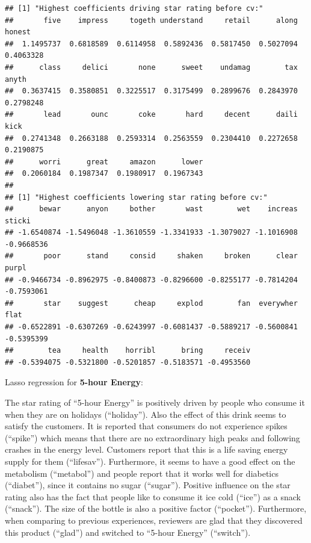 \documentclass[
]{article}
\begin{document}
\begin{verbatim}
## [1] "Highest coefficients driving star rating before cv:"
##       five    impress     togeth understand     retail      along     honest 
##  1.1495737  0.6818589  0.6114958  0.5892436  0.5817450  0.5027094  0.4063328 
##      class     delici       none      sweet    undamag        tax      anyth 
##  0.3637415  0.3580851  0.3225517  0.3175499  0.2899676  0.2843970  0.2798248 
##       lead       ounc       coke       hard     decent      daili       kick 
##  0.2741348  0.2663188  0.2593314  0.2563559  0.2304410  0.2272658  0.2190875 
##      worri      great     amazon      lower 
##  0.2060184  0.1987347  0.1980917  0.1967343 
## 
## [1] "Highest coefficients lowering star rating before cv:"
##      bewar      anyon     bother       wast        wet    increas     sticki 
## -1.6540874 -1.5496048 -1.3610559 -1.3341933 -1.3079027 -1.1016908 -0.9668536 
##       poor      stand     consid     shaken     broken      clear      purpl 
## -0.9466734 -0.8962975 -0.8400873 -0.8296600 -0.8255177 -0.7814204 -0.7593061 
##       star    suggest      cheap     explod        fan  everywher       flat 
## -0.6522891 -0.6307269 -0.6243997 -0.6081437 -0.5889217 -0.5600841 -0.5395399 
##        tea     health    horribl      bring     receiv 
## -0.5394075 -0.5321800 -0.5201857 -0.5183571 -0.4953560
\end{verbatim}

\normalsize

Lasso regression for \textbf{5-hour Energy}:

The star rating of ``5-hour Energy'' is positively driven by people who
consume it when they are on holidays (``holiday''). Also the effect of
this drink seems to satisfy the customers. It is reported that consumers
do not experience spikes (``spike'') which means that there are no
extraordinary high peaks and following crashes in the energy level.
Customers report that this is a life saving energy supply for them
(``lifesav''). Furthermore, it seems to have a good effect on the
metabolism (``metabol'') and people report that it works well for
diabetics (``diabet''), since it contains no sugar (``sugar''). Positive
influence on the star rating also has the fact that people like to
consume it ice cold (``ice'') as a snack (``snack''). The size of the
bottle is also a positive factor (``pocket''). Furthermore, when
comparing to previous experiences, reviewers are glad that they
discovered this product (``glad'') and switched to ``5-hour Energy''
(``switch'').
\end{document}
